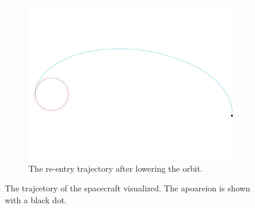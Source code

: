 \begin{figure}
\begin{subfigure}[b]{0.7\textwidth}
		\label{fig:parking_trajectory}
	\end{subfigure}
	\begin{subfigure}[b]{0.7\textwidth}
		\vspace{-22mm}
		\includegraphics[width=\textwidth]{./Figure/Orbit/re-entry_trajectory.pdf}
		\vspace{-25mm}
		\caption{The re-entry trajectory after lowering the orbit.}
		\label{fig:re_entry_trajectory}
	\end{subfigure}
	\caption{The trajcetory of the spacecraft visualized. The apoareion is shown with a black dot.}
	\label{fig:dep}
\end{figure}

